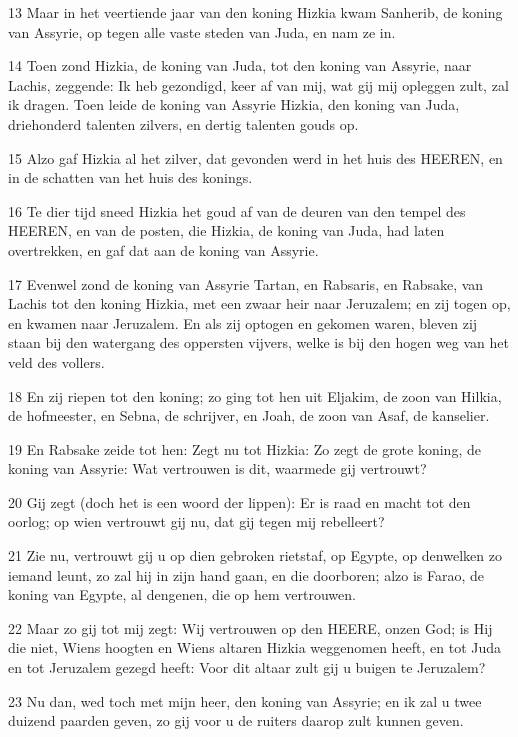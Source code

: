 \par 13 Maar in het veertiende jaar van den koning Hizkia kwam Sanherib, de koning van Assyrie, op tegen alle vaste steden van Juda, en nam ze in.
\par 14 Toen zond Hizkia, de koning van Juda, tot den koning van Assyrie, naar Lachis, zeggende: Ik heb gezondigd, keer af van mij, wat gij mij opleggen zult, zal ik dragen. Toen leide de koning van Assyrie Hizkia, den koning van Juda, driehonderd talenten zilvers, en dertig talenten gouds op.
\par 15 Alzo gaf Hizkia al het zilver, dat gevonden werd in het huis des HEEREN, en in de schatten van het huis des konings.
\par 16 Te dier tijd sneed Hizkia het goud af van de deuren van den tempel des HEEREN, en van de posten, die Hizkia, de koning van Juda, had laten overtrekken, en gaf dat aan de koning van Assyrie.
\par 17 Evenwel zond de koning van Assyrie Tartan, en Rabsaris, en Rabsake, van Lachis tot den koning Hizkia, met een zwaar heir naar Jeruzalem; en zij togen op, en kwamen naar Jeruzalem. En als zij optogen en gekomen waren, bleven zij staan bij den watergang des oppersten vijvers, welke is bij den hogen weg van het veld des vollers.
\par 18 En zij riepen tot den koning; zo ging tot hen uit Eljakim, de zoon van Hilkia, de hofmeester, en Sebna, de schrijver, en Joah, de zoon van Asaf, de kanselier.
\par 19 En Rabsake zeide tot hen: Zegt nu tot Hizkia: Zo zegt de grote koning, de koning van Assyrie: Wat vertrouwen is dit, waarmede gij vertrouwt?
\par 20 Gij zegt (doch het is een woord der lippen): Er is raad en macht tot den oorlog; op wien vertrouwt gij nu, dat gij tegen mij rebelleert?
\par 21 Zie nu, vertrouwt gij u op dien gebroken rietstaf, op Egypte, op denwelken zo iemand leunt, zo zal hij in zijn hand gaan, en die doorboren; alzo is Farao, de koning van Egypte, al dengenen, die op hem vertrouwen.
\par 22 Maar zo gij tot mij zegt: Wij vertrouwen op den HEERE, onzen God; is Hij die niet, Wiens hoogten en Wiens altaren Hizkia weggenomen heeft, en tot Juda en tot Jeruzalem gezegd heeft: Voor dit altaar zult gij u buigen te Jeruzalem?
\par 23 Nu dan, wed toch met mijn heer, den koning van Assyrie; en ik zal u twee duizend paarden geven, zo gij voor u de ruiters daarop zult kunnen geven.

